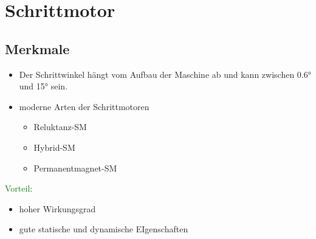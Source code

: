 \section{Schrittmotor}
    \subsection{Merkmale}
        \begin{itemize}
            \item Der Schrittwinkel hängt vom Aufbau der Maschine ab und kann zwischen 0.6° und 15° sein.
            \item moderne Arten der Schrittmotoren
            \begin{itemize}
                \item Reluktanz-SM
                \item Hybrid-SM
                \item Permanentmagnet-SM
            \end{itemize}
        \end{itemize}
        \textcolor{green}{Vorteil}:
        \begin{itemize}
            \item hoher Wirkungsgrad
            \item gute statische und dynamische EIgenschaften
        \end{itemize}
    
